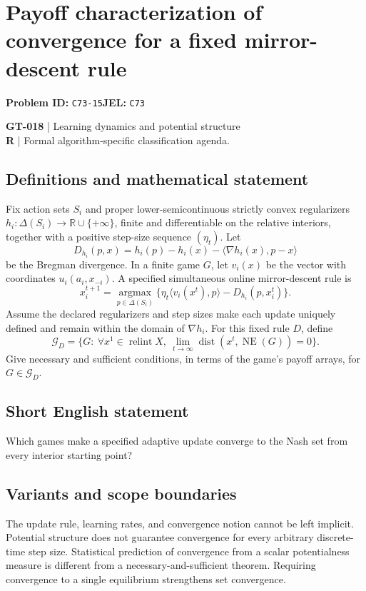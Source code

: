 \documentclass[11pt,a4paper]{article}
\begin{document}
\section*{Payoff characterization of convergence for a fixed mirror-descent rule}
\textbf{Problem ID:} \texttt{C73-15}\quad \textbf{JEL:} \texttt{C73}\par
\label{problem:OP-0148}
\label{game:GT-018}
{\sffamily\small\color{muted}
\textbf{GT-018} | Learning dynamics and potential structure\\
\textbf{R} | Formal algorithm-specific classification agenda.
\par}
\subsection*{Definitions and mathematical statement}
Fix action sets $S_i$ and proper lower-semicontinuous strictly convex regularizers $h_i:\Delta(S_i)\to\mathbb R\cup\{+\infty\}$, finite and differentiable on the relative interiors, together with a positive step-size sequence $(\eta_t)$. Let
\[
 D_{h_i}(p,x)=h_i(p)-h_i(x)-\langle\nabla h_i(x),p-x\rangle
\]
be the Bregman divergence. In a finite game $G$, let $v_i(x)$ be the vector with coordinates $u_i(a_i,x_{-i})$. A specified simultaneous online mirror-descent rule is
\[
 x_i^{t+1}=\underset{p\in\Delta(S_i)}{\operatorname{argmax}}
 \{\eta_t\langle v_i(x^t),p\rangle-D_{h_i}(p,x_i^t)\}.
\]
Assume the declared regularizers and step sizes make each update uniquely defined and remain within the domain of $\nabla h_i$. For this fixed rule $D$, define
\[
 \mathcal G_D=\{G:\ \forall x^1\in\operatorname{relint}X,
 \ \lim_{t\to\infty}\operatorname{dist}(x^t,\operatorname{NE}(G))=0\}.
\]
Give necessary and sufficient conditions, in terms of the game's payoff arrays, for $G\in\mathcal G_D$.
\subsection*{Short English statement}
Which games make a specified adaptive update converge to the Nash set from every interior starting point?
\subsection*{Variants and scope boundaries}
The update rule, learning rates, and convergence notion cannot be left implicit. Potential structure does not guarantee convergence for every arbitrary discrete-time step size. Statistical prediction of convergence from a scalar potentialness measure is different from a necessary-and-sufficient theorem. Requiring convergence to a single equilibrium strengthens set convergence.
\end{document}
